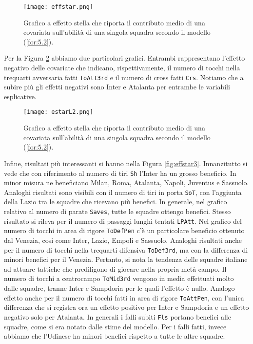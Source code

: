 \begin{figure}[htbp]
	\begin{center}
		\texttt{[image: effstar.png]}
		\caption{Grafico a effetto stella che riporta il contributo medio di una covariata sull'abilità di una singola squadra secondo il modello (\ref{for:5.2}).} \label{fig:effstar1}
	\end{center}
\end{figure}

Per la Figura \ref{fig:effstar2} abbiamo due particolari grafici. Entrambi rappresentano l'effetto negativo delle covariate che indicano, rispettivamente, il numero di tocchi nella trequarti avversaria fatti \texttt{ToAtt3rd} e il numero di cross fatti \texttt{Crs}. Notiamo che a subire più gli effetti negativi sono Inter e Atalanta per entrambe le variabili esplicative. 
\begin{figure}[htbp]
	\begin{center}
		\texttt{[image: estarL2.png]}
		\caption{Grafico a effetto stella che riporta il contributo medio di una covariata sull'abilità di una singola squadra secondo il modello (\ref{for:5.2}).} \label{fig:effstar2}
	\end{center}
\end{figure}
Infine, risultati più interessanti si hanno nella Figura \ref{fig:effstar3}. Innanzitutto si vede che con riferimento al numero di tiri \texttt{Sh} l'Inter ha un grosso beneficio. In minor misura ne beneficiano Milan, Roma, Atalanta, Napoli, Juventus e Sassuolo. Analoghi risultati sono visibili con il numero di tiri in porta \texttt{SoT}, con l'aggiunta della Lazio tra le squadre che ricevano più benefici. In generale, nel grafico relativo al numero di parate \texttt{Saves}, tutte le squadre ottengo benefici. Stesso risultato si rileva per il numero di passaggi lunghi tentati \texttt{LPAtt}. Nel grafico del numero di tocchi in area di rigore \texttt{ToDefPen} c'è un particolare beneficio ottenuto dal Venezia, cosi come Inter, Lazio, Empoli e Sassuolo. Analoghi risultati anche per il numero di tocchi nella trequarti difensiva \texttt{ToDef3rd}, ma con la differenza di minori benefici per il Venezia. Pertanto, si nota la tendenza delle squadre italiane ad attuare tattiche che prediligono di giocare nella propria metà campo. Il numero di tocchi a centrocampo \texttt{ToMid3rd} vengono in media effettuati molto dalle squadre, tranne Inter e Sampdoria per le quali l'effetto è nullo. Analogo effetto anche per il numero di tocchi fatti in area di rigore \texttt{ToAttPen}, con l'unica differenza che si registra ora un effetto positivo per Inter e Sampdoria e un effetto negativo solo per Atalanta. In generali i falli subiti \texttt{Fls} portano benefici alle squadre, come si era notato dalle stime del modello. Per i falli fatti, invece abbiamo che l'Udinese ha minori benefici rispetto a tutte le altre squadre. \\
